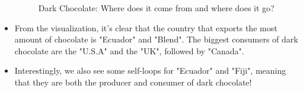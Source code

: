 \documentclass[a4paper]{article}
\begin{document}
\begin{itemize}
\begin{figure}[H]
        \caption{Dark Chocolate: Where does it come from and where does it go?}
        \label{fig:sankey}
    \end{figure}
    \item From the visualization, it's clear that the country that exports the most amount of chocolate is "Ecuador" and "Blend". The biggest consumers of dark chocolate are the "U.S.A" and the "UK", followed by "Canada".
    \item Interestingly, we also see some self-loops for "Ecuador" and "Fiji", meaning that they are both the producer and consumer of dark chocolate!
\end{itemize}
\end{document}
